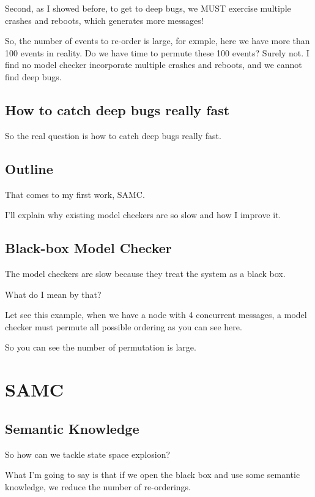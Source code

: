 Second, as I showed before, to get to deep bugs, we MUST exercise multiple
crashes and reboots, which generates more messages!

So, the number of events to re-order is large, for exmple, here we have more
than 100 events in reality. Do we have time to permute these 100 events? Surely
not. I find no model checker incorporate multiple crashes and reboots, and we
cannot find deep bugs.

\subsection{How to catch deep bugs really fast}

So the real question is how to catch deep bugs really fast.

\subsection{Outline}

That comes to my first work, SAMC.

I'll explain why existing model checkers are so slow and how I improve it.

\subsection{Black-box Model Checker}

The model checkers are slow because they treat the system as a black box. 

What do I mean by that?

Let see this example, when we have a node with 4 concurrent messages, a model
checker must permute all possible ordering as you can see here.

So you can see the number of permutation is large.

\section{SAMC}

\subsection{Semantic Knowledge}

So how can we tackle state space explosion?

What I'm going to say is that if we open the black box and use some semantic
knowledge, we reduce the number of re-orderings.

